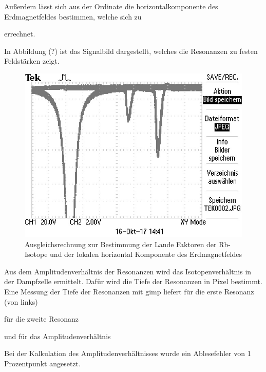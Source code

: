 Außerdem lässt sich aus der Ordinate die horizontalkomponente des Erdmagnetfeldes bestimmen,
welche sich zu



errechnet.

In Abbildung (?) ist das Signalbild dargestellt, welches die Resonanzen zu festen
Feldstärken zeigt.

\begin{figure}[h]
\centering
\includegraphics[scale=0.8]{./optischesPumpen/img/TEK0002.JPG}
\caption{Ausgleichsrechnung zur Bestimmung der Lande Faktoren der Rb-Isotope und der lokalen horizontal Komponente des Erdmagnetfeldes}
\label{aufbau}
\end{figure}


Aus dem Amplitudenverhältnis der Resonanzen wird das Isotopenverhältnis in der
Dampfzelle ermittelt. Dafür wird die Tiefe der Resonanzen in Pixel bestimmt.
Eine Messung der Tiefe der Resonanzen mit gimp liefert für die erste Resonanz (von links)



für die zweite Resonanz



und für das Amplitudenverhältnis



Bei der Kalkulation des Amplitudenverhältnisses wurde ein Ablesefehler von 1 Prozentpunkt
angesetzt.
